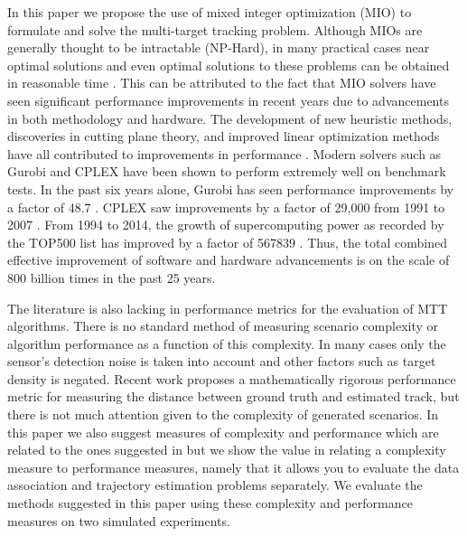 \documentclass[journal]{IEEEtran}
\begin{document}
In this paper we propose the use of mixed integer optimization (MIO) to formulate and solve the multi-target tracking problem. Although MIOs are generally thought to be intractable (NP-Hard), in many practical cases near optimal solutions and even optimal solutions to these problems can be obtained in reasonable time \cite{Computation}. This can be attributed to the fact that MIO solvers have seen significant performance improvements in recent years due to advancements in both methodology and hardware. The development of new heuristic methods, discoveries in cutting plane theory, and improved linear optimization methods have all contributed to improvements in performance \cite{Gurobi-MIP}. Modern solvers such as Gurobi and CPLEX have been shown to perform extremely well on benchmark tests. In the past six years alone, Gurobi has seen performance improvements by a factor of 48.7 \cite{Gurobi-Benchmark}. CPLEX saw improvements by a factor of 29,000 from 1991 to 2007 \cite{CPLEX-Benchmark}. From 1994 to 2014, the growth of supercomputing power as recorded by the TOP500 list has improved by a factor of 567839 \cite{Supercomputer}. Thus, the total combined effective improvement of software and hardware advancements is on the scale of 800 billion times in the past 25 years. 

The literature is also lacking in performance metrics for the evaluation of MTT algorithms. There is no standard method of measuring scenario complexity or algorithm performance as a function of this complexity. In many cases only the sensor's detection noise is taken into account and other factors such as target density is negated. Recent work \cite{MTT-Performance} proposes a mathematically rigorous performance metric for measuring the distance between ground truth and estimated track, but there is not much attention given to the complexity of generated scenarios. In this paper we also suggest measures of complexity and performance which are related to the ones suggested in \cite{MTT-Performance} but we show the value in relating a complexity measure to performance measures, namely that it allows you to evaluate the data association and trajectory estimation problems separately. We evaluate the methods suggested in this paper using these complexity and performance measures on two simulated experiments.
\end{document}
